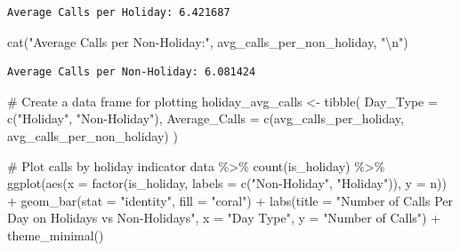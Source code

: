 \documentclass[
  letterpaper,
  DIV=11,
  numbers=noendperiod]{scrartcl}
\newenvironment{Shaded}{\begin{snugshade}}{\end{snugshade}}
\newcommand{\AttributeTok}[1]{\textcolor[rgb]{0.40,0.45,0.13}{#1}}
\newcommand{\CommentTok}[1]{\textcolor[rgb]{0.37,0.37,0.37}{#1}}
\newcommand{\FunctionTok}[1]{\textcolor[rgb]{0.28,0.35,0.67}{#1}}
\newcommand{\NormalTok}[1]{\textcolor[rgb]{0.00,0.23,0.31}{#1}}
\newcommand{\OtherTok}[1]{\textcolor[rgb]{0.00,0.23,0.31}{#1}}
\newcommand{\SpecialCharTok}[1]{\textcolor[rgb]{0.37,0.37,0.37}{#1}}
\newcommand{\StringTok}[1]{\textcolor[rgb]{0.13,0.47,0.30}{#1}}
\begin{document}
\begin{verbatim}
Average Calls per Holiday: 6.421687 
\end{verbatim}

\begin{Shaded}
\begin{Highlighting}[]
\FunctionTok{cat}\NormalTok{(}\StringTok{"Average Calls per Non{-}Holiday:"}\NormalTok{, avg\_calls\_per\_non\_holiday, }\StringTok{"}\SpecialCharTok{\textbackslash{}n}\StringTok{"}\NormalTok{)}
\end{Highlighting}
\end{Shaded}

\begin{verbatim}
Average Calls per Non-Holiday: 6.081424 
\end{verbatim}

\begin{Shaded}
\begin{Highlighting}[]
\CommentTok{\# Create a data frame for plotting}
\NormalTok{holiday\_avg\_calls }\OtherTok{\textless{}{-}} \FunctionTok{tibble}\NormalTok{(}
  \AttributeTok{Day\_Type =} \FunctionTok{c}\NormalTok{(}\StringTok{"Holiday"}\NormalTok{, }\StringTok{"Non{-}Holiday"}\NormalTok{),}
  \AttributeTok{Average\_Calls =} \FunctionTok{c}\NormalTok{(avg\_calls\_per\_holiday, avg\_calls\_per\_non\_holiday)}
\NormalTok{)}

\CommentTok{\# Plot calls by holiday indicator}
\NormalTok{data }\SpecialCharTok{\%\textgreater{}\%}
  \FunctionTok{count}\NormalTok{(is\_holiday) }\SpecialCharTok{\%\textgreater{}\%}
  \FunctionTok{ggplot}\NormalTok{(}\FunctionTok{aes}\NormalTok{(}\AttributeTok{x =} \FunctionTok{factor}\NormalTok{(is\_holiday, }\AttributeTok{labels =} \FunctionTok{c}\NormalTok{(}\StringTok{"Non{-}Holiday"}\NormalTok{, }\StringTok{"Holiday"}\NormalTok{)), }\AttributeTok{y =}\NormalTok{ n)) }\SpecialCharTok{+}
  \FunctionTok{geom\_bar}\NormalTok{(}\AttributeTok{stat =} \StringTok{"identity"}\NormalTok{, }\AttributeTok{fill =} \StringTok{"coral"}\NormalTok{) }\SpecialCharTok{+}
  \FunctionTok{labs}\NormalTok{(}\AttributeTok{title =} \StringTok{"Number of Calls Per Day on Holidays vs Non{-}Holidays"}\NormalTok{, }\AttributeTok{x =} \StringTok{"Day Type"}\NormalTok{, }\AttributeTok{y =} \StringTok{"Number of Calls"}\NormalTok{) }\SpecialCharTok{+} \FunctionTok{theme\_minimal}\NormalTok{()}
\end{Highlighting}
\end{Shaded}
\end{document}
